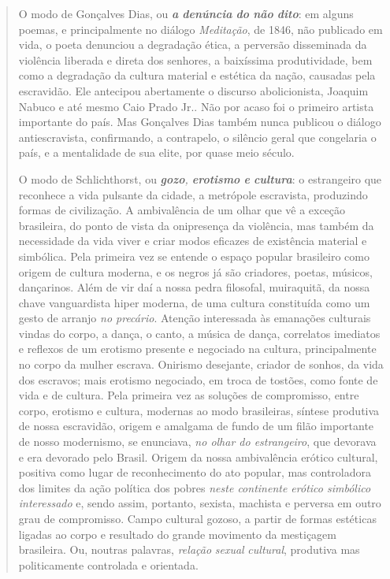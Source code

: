 \begin{quote}
O modo de Gonçalves Dias, ou \emph{\textbf{a} \textbf{denúncia}
\textbf{do} \textbf{não} \textbf{dito}}: em alguns poemas, e
principalmente no diálogo \emph{Meditação}, de 1846, não publicado em
vida, o poeta denunciou a degradação ética, a perversão disseminada da
violência liberada e direta dos senhores, a baixíssima produtividade,
bem como a degradação da cultura material e estética da nação, causadas
pela escravidão. Ele antecipou abertamente o discurso abolicionista,
Joaquim Nabuco e até mesmo Caio Prado Jr.. Não por acaso foi o primeiro
artista importante do país. Mas Gonçalves Dias também nunca publicou o
diálogo antiescravista, confirmando, a contrapelo, o silêncio geral que
congelaria o país, e a mentalidade de sua elite, por quase meio século.

O modo de Schlichthorst, ou \emph{\textbf{gozo}, \textbf{erotismo}
\textbf{e} \textbf{cultura}}: o estrangeiro que reconhece a vida
pulsante da cidade, a metrópole escravista, produzindo formas de
civilização. A ambivalência de um olhar que vê a exceção brasileira, do
ponto de vista da onipresença da violência, mas também da necessidade da
vida viver e criar modos eficazes de existência material e simbólica.
Pela primeira vez se entende o espaço popular brasileiro como origem de
cultura moderna, e os negros já são criadores, poetas, músicos,
dançarinos. Além de vir daí a nossa pedra filosofal, muiraquitã, da
nossa chave vanguardista hiper moderna, de uma cultura constituída como
um gesto de arranjo \emph{no precário}. Atenção interessada às emanações
culturais vindas do corpo, a dança, o canto, a música de dança,
correlatos imediatos e reflexos de um erotismo presente e negociado na
cultura, principalmente no corpo da mulher escrava. Onirismo desejante,
criador de sonhos, da vida dos escravos; mais erotismo negociado, em
troca de tostões, como fonte de vida e de cultura. Pela primeira vez as
soluções de compromisso, entre corpo, erotismo e cultura, modernas ao
modo brasileiras, síntese produtiva de nossa escravidão, origem e
amalgama de fundo de um filão importante de nosso modernismo, se
enunciava, \emph{no olhar do estrangeiro}, que devorava e era devorado
pelo Brasil. Origem da nossa ambivalência erótico cultural, positiva
como lugar de reconhecimento do ato popular, mas controladora dos
limites da ação política dos pobres \emph{neste continente erótico
simbólico interessado} e, sendo assim, portanto, sexista, machista e
perversa em outro grau de compromisso. Campo cultural gozoso, a partir
de formas estéticas ligadas ao corpo e resultado do grande movimento da
mestiçagem brasileira. Ou, noutras palavras, \emph{relação}
\emph{sexual} \emph{cultural}, produtiva mas politicamente controlada e
orientada.


\end{quote}
